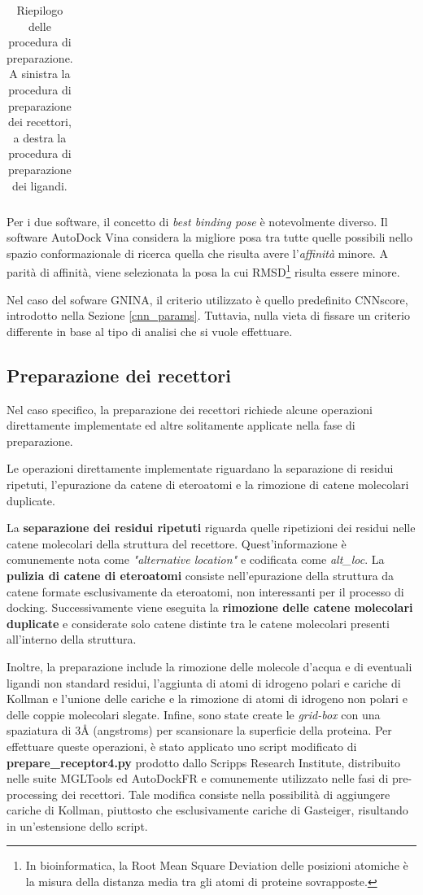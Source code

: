 \begin{table}[H]
{\begin{tabular}{|cl|}
\end{tabular}%
}
\caption[Riepilogo delle procedura di preparazione.]{Riepilogo delle procedura di preparazione. A sinistra la procedura di preparazione dei recettori, a destra la procedura di preparazione dei ligandi. }
\label{preparation_table}
\end{table}

Per i due software, il concetto di \textit{best binding pose} è notevolmente diverso. 
Il software AutoDock Vina considera la migliore posa tra tutte quelle possibili nello spazio conformazionale di ricerca quella che risulta avere l'\textit{affinità} minore. A parità di affinità, viene selezionata la posa la cui RMSD\footnote{In bioinformatica, la Root Mean Square Deviation delle posizioni atomiche è la misura della distanza media tra gli atomi di proteine sovrapposte.} risulta essere minore.

Nel caso del sofware GNINA, il criterio utilizzato è quello predefinito CNNscore, introdotto nella Sezione \ref{cnn_params}. Tuttavia, nulla vieta di fissare un criterio differente in base al tipo di analisi che si vuole effettuare.


\subsection{Preparazione dei recettori}
Nel caso specifico, la preparazione dei recettori richiede alcune operazioni direttamente implementate ed altre solitamente applicate nella fase di preparazione.

Le operazioni direttamente implementate riguardano la separazione di residui ripetuti, l'epurazione da catene di eteroatomi e la rimozione di catene molecolari duplicate.

La \textbf{separazione dei residui ripetuti} riguarda quelle ripetizioni dei residui nelle catene molecolari della struttura del recettore. Quest'informazione è comunemente nota come \textit{"alternative location"} e codificata come \textit{alt\_loc}. La \textbf{pulizia di catene di eteroatomi} consiste nell'epurazione della struttura da catene formate esclusivamente da eteroatomi, non interessanti per il processo di docking. Successivamente viene eseguita la \textbf{rimozione delle catene molecolari duplicate} e considerate solo catene distinte tra le catene molecolari presenti all'interno della struttura.

Inoltre, la preparazione include la rimozione delle molecole d'acqua e di eventuali ligandi non standard residui, l'aggiunta di atomi di idrogeno polari e cariche di Kollman e l'unione delle cariche e la rimozione di atomi di idrogeno non polari e delle coppie molecolari slegate. Infine, sono state create le \textit{grid-box} con una spaziatura di 3Å (angstroms) per scansionare la superficie della proteina.
Per effettuare queste operazioni, è stato applicato uno script modificato di \textbf{prepare\_receptor4.py} prodotto dallo Scripps Research Institute, distribuito nelle suite MGLTools ed AutoDockFR e comunemente utilizzato nelle fasi di pre-processing dei recettori. Tale modifica consiste nella possibilità di aggiungere cariche di Kollman, piuttosto che esclusivamente cariche di Gasteiger, risultando in un'estensione dello script. 


